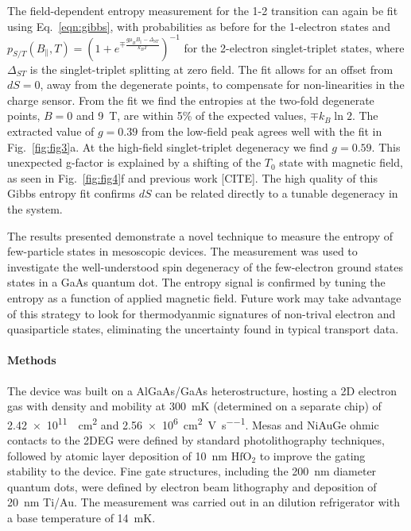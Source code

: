 \documentclass[twocolumn,showpacs,preprintnumbers,amsmath,amssymb,pra,aps,superscriptaddress]{revtex4-1}
\begin{document}
The field-dependent entropy measurement for the 1-2 transition can again be fit using Eq.~\ref{eqn:gibbs}, with probabilities as before for the 1-electron states and $p_{S/T}(B_\parallel, T) = (1+ e^{\mp \frac{g\mu_B B_\parallel - \Delta_{ST}}{k_B T}})^{-1}$ for the 2-electron singlet-triplet states, where $\Delta_{ST}$ is the singlet-triplet splitting at zero field. The fit allows for an offset from $dS=0$, away from the degenerate points, to compensate for non-linearities in the charge sensor. From the fit we find the entropies at the two-fold degenerate points, $B=0$ and \SI{9}{\tesla}, are within 5\% of the expected values, $\mp k_B \ln{2}$. The extracted value of $g = 0.39$ from the low-field peak agrees well with the fit in Fig.~\ref{fig:fig3}a. At the high-field singlet-triplet degeneracy we find $g = 0.59$. This unexpected g-factor is explained by a shifting of the $T_{0}$ state with magnetic field, as seen in Fig.~\ref{fig:fig4}f and previous work [CITE]. The high quality of this Gibbs entropy fit confirms $dS$ can be related directly to a tunable degeneracy in the system.

The results presented demonstrate a novel technique to measure the entropy of few-particle states in mesoscopic devices. The measurement was used to investigate the well-understood spin degeneracy of the few-electron ground states states in a GaAs quantum dot. The entropy signal is confirmed by tuning the entropy as a function of applied magnetic field. Future work may take advantage of this strategy to look for thermodyanmic signatures of non-trival electron and quasiparticle states, eliminating the uncertainty found in typical transport data.

\paragraph*{Methods} The device was built on a AlGaAs/GaAs heterostructure, hosting a 2D electron gas with density and mobility at \SI{300}{\milli\kelvin} (determined on a separate chip) of \SI{2.42e11}{\per\square\centi\metre} and \SI[per-mode=symbol]{2.56e6}{\square\centi\metre\per\volt\per\second}.   Mesas and NiAuGe ohmic contacts to the 2DEG were defined by standard photolithography techniques, followed by atomic layer deposition of \SI{10}{\nano\metre} $\mathrm{HfO_2}$ to improve the gating stability to the device. Fine gate structures, including the \SI{200}{\nano\metre} diameter quantum dots, were defined by electron beam lithography and deposition of \SI{20}{\nano\metre} Ti/Au. The measurement was carried out in an dilution refrigerator with a base temperature of \SI{14}{\milli\kelvin}.
\end{document}
